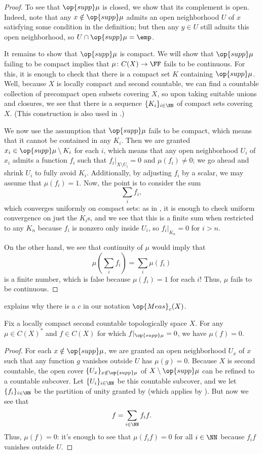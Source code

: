 \documentclass[../notes.tex]{subfiles}
\begin{document}
\begin{proof}
	To see that $\op{supp}\mu$ is closed, we show that its complement is open. Indeed, note that any $x\notin\op{supp}\mu$ admits an open neighborhood $U$ of $x$ satisfying some condition in the definition; but then any $y\in U$ still admits this open neighborhood, so $U\cap\op{supp}\mu=\emp$.

	It remains to show that $\op{supp}\mu$ is compact. We will show that $\op{supp}\mu$ failing to be compact implies that $\mu\colon C(X)\to\FF$ fails to be continuous. For this, it is enough to check that there is a compact set $K$ containing $\op{supp}\mu$. Well, because $X$ is locally compact and second countable, we can find a countable collection of precompact open subsets covering $X$, so upon taking suitable unions and closures, we see that there is a sequence $\{K_i\}_{i\in\NN}$ of compact sets covering $X$. (This construction is also used in .)

	We now use the assumption that $\op{supp}\mu$ fails to be compact, which means that it cannot be contained in any $K_i$. Then we are granted $x_i\in\op{supp}\mu\setminus K_i$ for each $i$, which means that any open neighborhood $U_i$ of $x_i$ admits a function $f_i$ such that $f_i|_{X\setminus U_i}=0$ and $\mu(f_i)\ne0$; we go ahead and shrink $U_i$ to fully avoid $K_i$. Additionally, by adjusting $f_i$ by a scalar, we may assume that $\mu(f_i)=1$. Now, the point is to consider the sum
	\[\sum_if_i,\]
	which converges uniformly on compact sets: as in , it is enough to check uniform convergence on just the $K_i$s, and we see that this is a finite sum when restricted to any $K_n$ because $f_i$ is nonzero only inside $U_i$, so $f_i|_{K_n}=0$ for $i>n$.

	On the other hand, we see that continuity of $\mu$ would imply that
	\[\mu\left(\sum_if_i\right)=\sum_i\mu(f_i)\]
	is a finite number, which is false because $\mu(f_i)=1$ for each $i$! Thus, $\mu$ fails to be continuous.
\end{proof}
\begin{remark}
	 explains why there is a $c$ in our notation $\op{Meas}_c(X)$.
\end{remark}
\begin{lemma} \label{lem:meas-depends-on-supp}
	Fix a locally compact second countable topologically space $X$. For any $\mu\in C(X)^*$ and $f\in C(X)$ for which $f|_{\op{supp}\mu}=0$, we have $\mu(f)=0$.
\end{lemma}
\begin{proof}
	For each $x\notin\op{supp}\mu$, we are granted an open neighborhood $U_x$ of $x$ such that any function $g$ vanishes outside $U$ has $\mu(g)=0$. Because $X$ is second countable, the open cover $\{U_x\}_{x\notin\op{supp}\mu}$ of $X\setminus\op{supp}\mu$ can be refined to a countable subcover. Let $\{U_i\}_{i\in\NN}$ be this countable subcover, and we let $\{f_i\}_{i\in\NN}$ be the partition of unity granted by  (which applies by ). But now we see that
	\[f=\sum_{i\in\NN}f_if.\]
	Thus, $\mu(f)=0$: it's enough to see that $\mu(f_if)=0$ for all $i\in\NN$ because $f_if$ vanishes outside $U$.
\end{proof}
\end{document}
